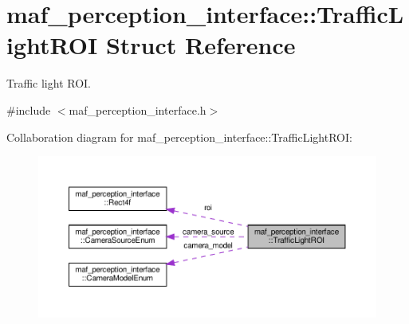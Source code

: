 \hypertarget{structmaf__perception__interface_1_1TrafficLightROI}{}\section{maf\+\_\+perception\+\_\+interface\+:\+:Traffic\+Light\+R\+OI Struct Reference}
\label{structmaf__perception__interface_1_1TrafficLightROI}


Traffic light R\+OI.  




{\ttfamily \#include $<$maf\+\_\+perception\+\_\+interface.\+h$>$}



Collaboration diagram for maf\+\_\+perception\+\_\+interface\+:\+:Traffic\+Light\+R\+OI\+:\nopagebreak
\begin{figure}[H]
\begin{center}
\leavevmode
\includegraphics[width=350pt]{structmaf__perception__interface_1_1TrafficLightROI__coll__graph}
\end{center}
\end{figure}
